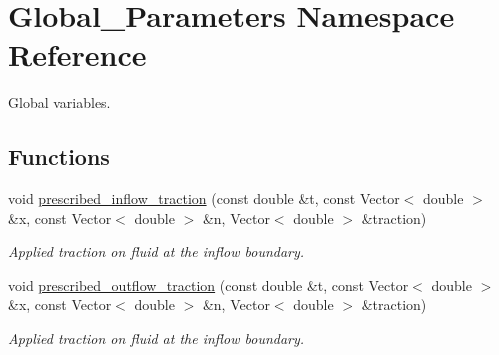 \hypertarget{namespaceGlobal__Parameters}{}\section{Global\+\_\+\+Parameters Namespace Reference}
\label{namespaceGlobal__Parameters}


Global variables.  


\subsection*{Functions}
\begin{DoxyCompactItemize}
\item 
void \hyperlink{namespaceGlobal__Parameters_af7faf65214ed9ead637f7c208addb095}{prescribed\+\_\+inflow\+\_\+traction} (const double \&t, const Vector$<$ double $>$ \&x, const Vector$<$ double $>$ \&n, Vector$<$ double $>$ \&traction)
\begin{DoxyCompactList}\small\item\em Applied traction on fluid at the inflow boundary. \end{DoxyCompactList}\item 
void \hyperlink{namespaceGlobal__Parameters_a83155358b144cff7e29ecb6b209a2d3e}{prescribed\+\_\+outflow\+\_\+traction} (const double \&t, const Vector$<$ double $>$ \&x, const Vector$<$ double $>$ \&n, Vector$<$ double $>$ \&traction)
\begin{DoxyCompactList}\small\item\em Applied traction on fluid at the inflow boundary. \end{DoxyCompactList}\end{DoxyCompactItemize}

